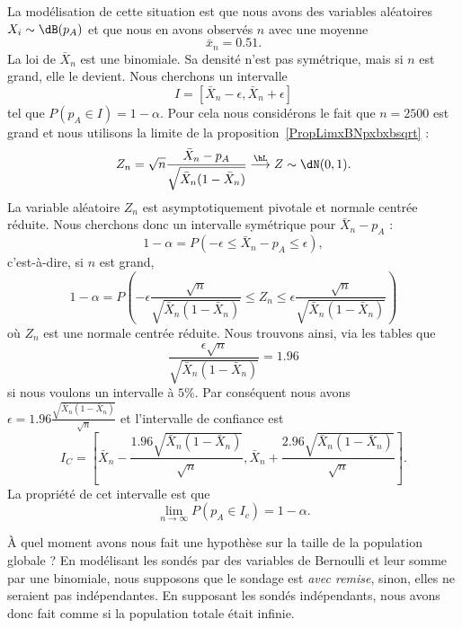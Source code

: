 La modélisation de cette situation est que nous avons des variables aléatoires \( X_i\sim\dB(p_A)\) et que nous en avons observés \( n\) avec une moyenne
\begin{equation}
	\bar x_n=0.51.
\end{equation}
La loi de \( \bar X_n\) est une binomiale. Sa densité n'est pas symétrique, mais si \( n\) est grand, elle le devient. Nous cherchons un intervalle
\begin{equation}
	I=[\bar X_n-\epsilon,\bar X_n+\epsilon]
\end{equation}
tel que \( P(p_A\in I)=1-\alpha\). Pour cela nous considérons le fait que \( n=2500\) est grand et nous utilisons la limite de la proposition~\ref{PropLimxBNpxbxbsqrt} :
\begin{equation}
	Z_n=\sqrt{n}\frac{ \bar X_n-p_A }{ \sqrt{\bar X_n(1-\bar X_n)} }\stackrel{\hL}{\longrightarrow}Z\sim\dN(0,1).
\end{equation}
La variable aléatoire \( Z_n\) est asymptotiquement pivotale et normale centrée réduite. Nous cherchons donc un intervalle symétrique pour \( \bar X_n-p_A\) :
\begin{equation}
	1-\alpha=P(-\epsilon\leq \bar X_n-p_A\leq \epsilon),
\end{equation}
c'est-à-dire, si \( n\) est grand,
\begin{equation}
	1-\alpha=P\left( -\epsilon\frac{ \sqrt{n} }{ \sqrt{\bar X_n(1-\bar X_n)} }\leq Z_n\leq\epsilon\frac{ \sqrt{n} }{ \sqrt{\bar X_n(1-\bar X_n)} } \right)
\end{equation}
où \( Z_n\) est une normale centrée réduite. Nous trouvons ainsi, via les tables que
\begin{equation}
	\frac{ \epsilon\sqrt{n} }{ \sqrt{\bar X_n(1-\bar X_n)} }=1.96
\end{equation}
si nous voulons un intervalle à \( 5\%\). Par conséquent nous avons \( \epsilon=1.96\frac{ \sqrt{\bar X_n(1-\bar X_n)} }{ \sqrt{n} }\) et l'intervalle de confiance est
\begin{equation}
	I_C=\left[ \bar X_n-\frac{ 1.96\sqrt{\bar X_n(1-\bar X_n)} }{ \sqrt{n} },\bar X_n+\frac{ 2.96\sqrt{\bar X_n(1-\bar X_n)} }{ \sqrt{n} } \right].
\end{equation}
La propriété de cet intervalle est que
\begin{equation}
	\lim_{n\to \infty} P(p_A\in I_c)=1-\alpha.
\end{equation}

\begin{remark}
	À quel moment avons nous fait une hypothèse sur la taille de la population globale ? En modélisant les sondés par des variables de Bernoulli et leur somme par une binomiale, nous supposons que le sondage est \emph{avec remise}, sinon, elles ne seraient pas indépendantes. En supposant les sondés indépendants, nous avons donc fait comme si la population totale était infinie.
\end{remark}

